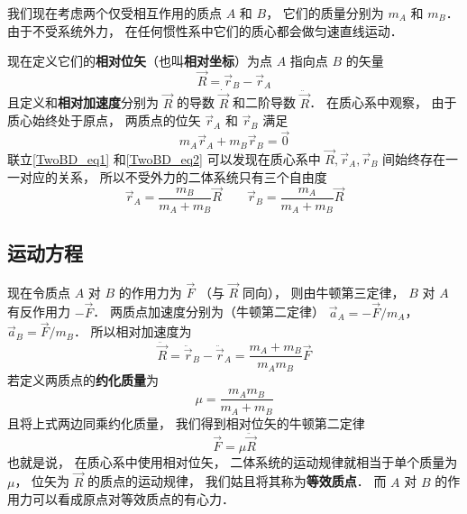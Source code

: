 

我们现在考虑两个仅受相互作用的质点 $A$ 和 $B$， 它们的质量分别为 $m_A$ 和 $m_B$． 由于不受系统外力， 在任何惯性系中它们的质心都会做匀速直线运动．%

现在定义它们的\textbf{相对位矢}（也叫\textbf{相对坐标}）为点 $A$ 指向点 $B$ 的矢量
\begin{equation}\label{TwoBD_eq1}
\vec R = \vec r_B - \vec r_A
\end{equation}
且定义和\textbf{相对加速度}分别为 $\vec R$ 的导数 $\dot{\vec R}$ 和二阶导数 $\ddot{\vec R}$．
在质心系中观察， 由于质心始终处于原点， 两质点的位矢 $\vec r_A$ 和 $\vec r_B$ 满足
\begin{equation}\label{TwoBD_eq2}
m_A \vec r_A + m_B \vec r_B = \vec 0
\end{equation}
联立\autoref{TwoBD_eq1} 和\autoref{TwoBD_eq2} 可以发现在质心系中 $\vec R, \vec r_A, \vec r_B$ 间始终存在一一对应的关系， 所以不受外力的二体系统只有三个自由度
\begin{equation}\label{TwoBD_eq3}
\vec r_A = \frac{m_B}{m_A + m_B} \vec R \qquad \vec r_B = \frac{m_A}{m_A + m_B} \vec R
\end{equation}

\subsection{运动方程}

现在令质点 $A$ 对 $B$ 的作用力为 $\vec F$ （与 $\vec R$ 同向）， 则由牛顿第三定律， $B$ 对 $A$ 有反作用力 $- \vec F$． 两质点加速度分别为（牛顿第二定律） $\vec a_A =  -\vec F/m_A$， $\vec a_B =  \vec F/m_B$． 所以相对加速度为
\begin{equation}
\ddot{\vec R} = \ddot{\vec r}_B - \ddot{\vec r}_A = \frac{m_A+m_B}{m_Am_B} \vec F
\end{equation}
若定义两质点的\textbf{约化质量}为
\begin{equation}
\mu = \frac{m_A m_B}{m_A + m_B}
\end{equation}
且将上式两边同乘约化质量， 我们得到相对位矢的牛顿第二定律
\begin{equation}
\vec F = \mu\ddot{\vec R}
\end{equation}
也就是说， 在质心系中使用相对位矢， 二体系统的运动规律就相当于单个质量为 $\mu$， 位矢为 $\vec R$ 的质点的运动规律， 我们姑且将其称为\textbf{等效质点}． 而 $A$ 对 $B$ 的作用力可以看成原点对等效质点的有心力．

